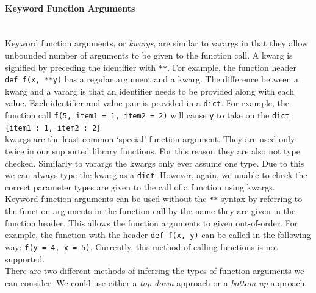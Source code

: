\documentclass[12pt, titlepage]{article}
\begin{document}
\paragraph*{Keyword Function Arguments}\mbox{} \\
Keyword function arguments, or \textit{kwargs}, are similar to varargs in that they allow unbounded number of arguments to be given to the function call. A kwarg is signified by preceding the identifier with \texttt{**}. For example, the function header \texttt{def f(x, **y)} has a regular argument and a kwarg. The difference between a kwarg and a vararg is that an identifier needs to be provided along with each value. Each identifier and value pair is provided in a \texttt{dict}. For example, the function call \texttt{f(5, item1 = 1, item2 = 2)} will cause \texttt{y} to take on the \texttt{dict} \texttt{\{item1 : 1, item2 : 2\}}. \\
\indent kwargs are the least common `special' function argument. They are used only twice in our supported library functions. For this reason they are also not type checked. Similarly to varargs the kwargs only ever assume one type. Due to this we can always type the kwarg as a \texttt{dict}. However, again, we unable to check the correct parameter types are given to the call of a function using kwargs. \\
\indent Keyword function arguments can be used without the \texttt{**} syntax by referring to the function arguments in the function call by the name they are given in the function header. This allows the function arguments to given out-of-order. For example, the function with the header \texttt{def f(x, y)} can be called in the following way: \texttt{f(y = 4, x = 5)}. Currently, this method of calling functions is not supported. \\



There are two different methods of inferring the types of function arguments we can consider. We could use either a \textit{top-down} approach or a \textit{bottom-up} approach.
\end{document}
